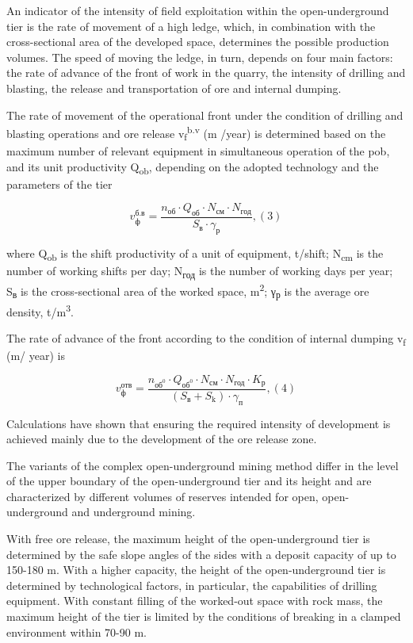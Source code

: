 \begin{multicols}{2}
An indicator of the intensity of field exploitation within the
open-underground tier is the rate of movement of a high ledge, which, in
combination with the cross-sectional area of the developed space,
determines the possible production volumes. The speed of moving the
ledge, in turn, depends on four main factors: the rate of advance of the
front of work in the quarry, the intensity of drilling and blasting, the
release and transportation of ore and internal dumping.

The rate of movement of the operational front under the condition of
drilling and blasting operations and ore release
v\textsubscript{f}\textsuperscript{b.v} (m /year) is determined based on
the maximum number of relevant equipment in simultaneous operation of
the pob, and its unit productivity Q\textsubscript{ob}, depending on the
adopted technology and the parameters of the tier

\[v_{\text{ф}}^{\text{б.в}} = \frac{n_{\text{об}} \cdot Q_{\text{об}} \cdot N_{\text{см}} \cdot N_{\text{год}}}{S_{\text{в}} \cdot \gamma_{\text{р}}},(3)\]

where Q\textsubscript{ob} is the shift productivity of a unit of
equipment, t/shift; N\textsubscript{cm} is the number of working shifts
per day; N\textsubscript{год} is the number of working days per year;
S\textsubscript{в} is the cross-sectional area of the worked space,
m\textsuperscript{2}; γ\textsubscript{р} is the average ore density,
t/m\textsuperscript{3}.

The rate of advance of the front according to the condition of internal
dumping v\textsubscript{f} (m/ year) is

\[v_{\text{ф}}^{\text{отв}} = \frac{n_{\text{об}^{0}} \cdot Q_{\text{об}^{0}} \cdot N_{\text{см}} \cdot N_{\text{год}} \cdot K_{\text{р}}}{(S_{\text{в}} + S_{\text{k}}) \cdot \gamma_{\text{п}}},(4)\]

Calculations have shown that ensuring the required intensity of
development is achieved mainly due to the development of the ore release
zone.

The variants of the complex open-underground mining method differ in the
level of the upper boundary of the open-underground tier and its height
and are characterized by different volumes of reserves intended for
open, open-underground and underground mining.

With free ore release, the maximum height of the open-underground tier
is determined by the safe slope angles of the sides with a deposit
capacity of up to 150-180 m. With a higher capacity, the height of the
open-underground tier is determined by technological factors, in
particular, the capabilities of drilling equipment. With constant
filling of the worked-out space with rock mass, the maximum height of
the tier is limited by the conditions of breaking in a clamped
environment within 70-90 m.


\end{multicols}
